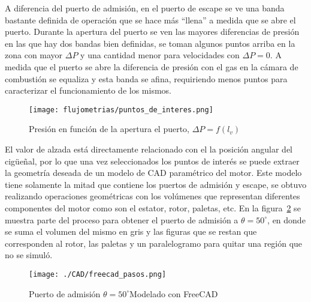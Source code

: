 A diferencia del puerto de admisión, en el puerto de escape se ve una banda
bastante definida de operación que se hace más ``llena'' a medida que se abre el
puerto.
%
Durante la apertura del puerto se ven las mayores diferencias de presión en las
que hay dos bandas bien definidas, se toman algunos puntos arriba en la zona con
mayor $\Delta P$ y una cantidad menor para velocidades con $\Delta P = 0$.
%
A medida que el puerto se abre la diferencia de presión con el gas en la cámara
de combustión se equaliza y esta banda se afina, requiriendo menos puntos para
caracterizar el funcionamiento de los mismos.

\begin{figure}
    \centering
    \texttt{[image: flujometrias/puntos\_de\_interes.png]}
    \caption{Presión en función de la apertura el puerto,
$\Delta P = f(l_{v})$}\label{fig:puntos_interes}
\end{figure}

%
El valor de alzada está directamente relacionado con el la posición angular del
cigüeñal, por lo que una vez seleccionados los puntos de interés se puede
extraer la geometría deseada de un modelo de CAD paramétrico del motor.
%
Este modelo tiene solamente la mitad que contiene los puertos de admisión y
escape, se obtuvo realizando operaciones geométricas con los volúmenes que
representan diferentes componentes del motor como son el estator, rotor,
paletas, etc.
%
En la figura~\ref{fig:admision_50} se muestra parte del proceso para obtener el
puerto de admisión a $\theta=50^{\circ}$, en donde se suma el volumen del mismo
en gris y las figuras que se restan que corresponden al rotor, las paletas y un
paralelogramo para quitar una región que no se simuló.

\begin{figure}
    \centering
    \texttt{[image: ./CAD/freecad\_pasos.png]}
    \caption{Puerto de admisión $\theta=50^{\circ}$Modelado con
FreeCAD}\label{fig:admision_50}
\end{figure}

